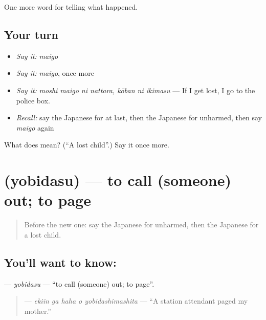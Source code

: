 \begin{grammarlens}[title={What you've built}]
One more word for telling what happened.
\end{grammarlens}

\subsection*{Your turn}
\begin{itemize}
\raggedright
  \item \emph{Say it:} \emph{maigo}
  \item \emph{Say it:} \emph{maigo}, once more
  \item \emph{Say it:} \emph{moshi maigo ni nattara, kōban ni ikimasu} — If I get lost, I go to the police box.
  \item \emph{Recall:} say the Japanese for at last, then the Japanese for unharmed, then say \emph{maigo} again
\end{itemize}

\begin{tcolorbox}[breakable,colback=teal!4,colframe=teal!35!black,title={Before you move on}]
What does  mean? (\textquotedblleft{}A lost child\textquotedblright{}.) Say it once more.
\end{tcolorbox}
\section[\texorpdfstring{\ja{よびだす} (yobidasu)}{よびだす (yobidasu)}]{ (yobidasu) — to call (someone) out; to page}

\label{lesson:JA-C267-yobidasu}



\begin{quote}
Before the new one: say the Japanese for unharmed, then the Japanese for a lost child.
\end{quote}

\subsection*{You'll want to know: }
\textbf{} — \emph{yobidasu} — \textquotedblleft{}to call (someone) out; to page\textquotedblright{}.

\begin{quote}
\textbf{  } — \emph{ekiin ga haha o yobidashimashita} — \textquotedblleft{}A station attendant paged my mother.\textquotedblright{}
\end{quote}


